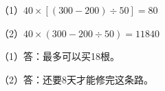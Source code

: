 
\begingroup\color{answerred}\par\endgroup
{}
\begingroup\color{answerred}\noindent（1）$40\times[(300-200)\div50]=80$\par
\noindent（2）$40\times(300-200\div50)=11840$\par\par\endgroup
{}
\begingroup\color{answerred}\noindent（1）答：最多可以买18根。\par
\noindent（2）答：还要8天才能修完这条路。\par\par\endgroup
